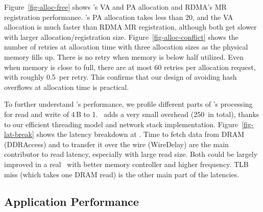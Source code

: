 Figure~\ref{fig-alloc-free} shows \sys's VA and PA allocation and RDMA's MR registration performance.
\sys's PA allocation takes less than 20\mus, and the VA allocation is much faster than RDMA MR registration,
although both get slower with larger allocation/registration size.
Figure~\ref{fig-alloc-conflict} shows the number of retries at allocation time with three allocation sizes as the physical memory fills up.
There is no retry when memory is below half utilized. Even when memory is close to full, there are at most 60 retries per allocation request, with roughly 0.5\ms\ per retry. This confirms that our design of avoiding hash overflows at allocation time is practical.


To further understand \sys's performance, %
we profile different parts of \sys's processing for read and write of 4\,B to 1\KB.
\syslib\ adds a very small overhead (250\ns\ in total), 
thanks to our efficient threading model and network stack implementation.
Figure~\ref{fig-lat-break} shows the latency breakdown at \sysboard.
Time to fetch data from DRAM (DDRAccess) and to transfer it over the wire (WireDelay) are the main 
contributor to read latency, especially with large read size.
Both could be largely improved in a real \sysboard\ with better memory controller and higher frequency.
TLB miss (which takes one DRAM read) is the other main part of the latencies.


\subsection{Application Performance}

